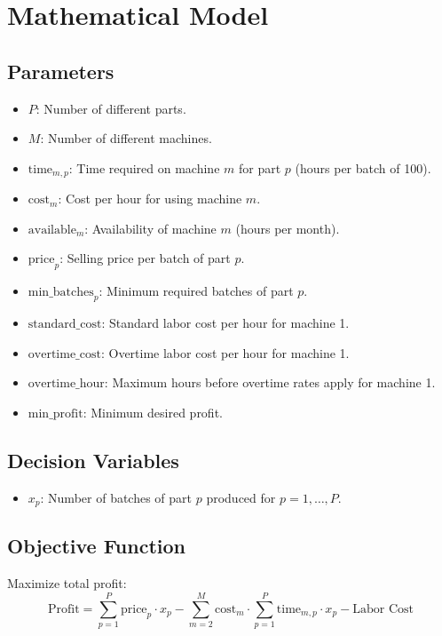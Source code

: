 \documentclass{article}
\begin{document}
\section*{Mathematical Model}

\subsection*{Parameters}
\begin{itemize}
    \item $P$: Number of different parts.
    \item $M$: Number of different machines.
    \item $\text{time}_{m,p}$: Time required on machine $m$ for part $p$ (hours per batch of 100).
    \item $\text{cost}_m$: Cost per hour for using machine $m$.
    \item $\text{available}_m$: Availability of machine $m$ (hours per month).
    \item $\text{price}_p$: Selling price per batch of part $p$.
    \item $\text{min\_batches}_p$: Minimum required batches of part $p$.
    \item $\text{standard\_cost}$: Standard labor cost per hour for machine 1.
    \item $\text{overtime\_cost}$: Overtime labor cost per hour for machine 1.
    \item $\text{overtime\_hour}$: Maximum hours before overtime rates apply for machine 1.
    \item $\text{min\_profit}$: Minimum desired profit.
\end{itemize}

\subsection*{Decision Variables}
\begin{itemize}
    \item $x_p$: Number of batches of part $p$ produced for $p = 1, \dots, P$.
\end{itemize}

\subsection*{Objective Function}
Maximize total profit:
\begin{equation*}
\text{Profit} = \sum_{p=1}^{P} \text{price}_p \cdot x_p - \sum_{m=2}^{M} \text{cost}_m \cdot \sum_{p=1}^{P} \text{time}_{m,p} \cdot x_p - \text{Labor Cost}
\end{equation*}
\end{document}
